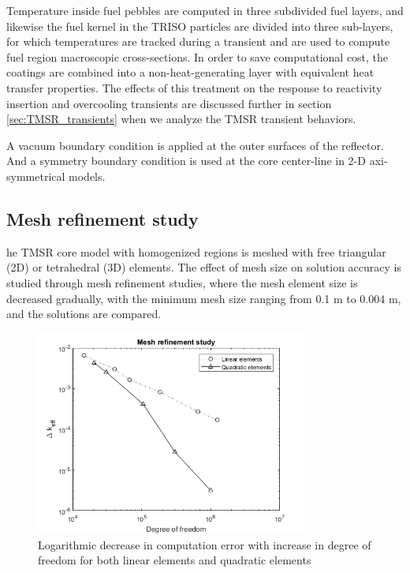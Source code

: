 \documentclass{elsarticle}
\begin{document}
Temperature inside fuel pebbles are computed in three subdivided fuel layers, and likewise the fuel kernel in the TRISO particles are divided into three sub-layers, for which temperatures are tracked during a transient and are used to compute fuel region macroscopic cross-sections. In order to save computational cost, the coatings are combined into a non-heat-generating layer with equivalent heat transfer properties. The effects of this treatment on the response to reactivity insertion and overcooling transients are discussed further in section \ref{sec:TMSR_transients} when we analyze the TMSR transient behaviors.

A vacuum boundary condition is applied at the outer surfaces of the reflector. And a symmetry boundary condition is used at the core center-line in 2-D axi-symmetrical models.




\subsection{Mesh refinement study}
he TMSR core model with homogenized regions is meshed with free triangular (2D) or tetrahedral (3D) elements. The effect of mesh size on solution accuracy is studied through mesh refinement studies, where the mesh element size is decreased gradually, with the minimum mesh size ranging from 0.1 m to 0.004 m, and the solutions are compared. 

\begin{figure}
\centering
    \includegraphics[width = 0.8\textwidth]{./images/diffusion/tmsr/mesh_refinement.png}  
    \caption{Logarithmic decrease in computation error with increase in degree of freedom for both linear elements and quadratic elements}
    \label{fig:mesh_refinement}
\end{figure}
\end{document}
